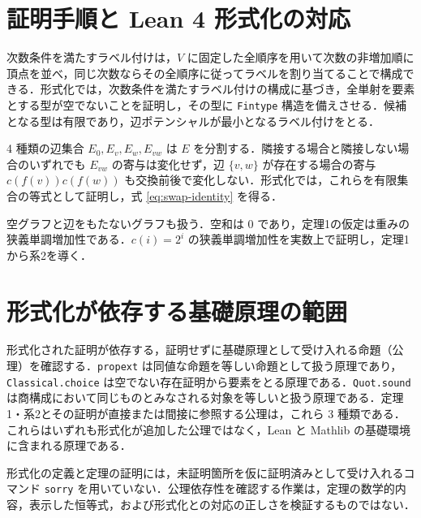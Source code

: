 \documentclass[lualatex,article]{jlreq}
\theoremstyle{jremark}
\begin{document}
\section{証明手順と Lean 4 形式化の対応}

次数条件を満たすラベル付けは，$V$ に固定した全順序を用いて次数の非増加順に頂点を並べ，同じ次数ならその全順序に従ってラベルを割り当てることで構成できる．形式化では，次数条件を満たすラベル付けの構成に基づき，全単射を要素とする型が空でないことを証明し，その型に \texttt{Fintype} 構造を備えさせる．候補となる型は有限であり，辺ポテンシャルが最小となるラベル付けをとる．

4 種類の辺集合 $E_0,E_v,E_w,E_{vw}$ は $E$ を分割する．隣接する場合と隣接しない場合のいずれでも $E_{vw}$ の寄与は変化せず，辺 $\{v,w\}$ が存在する場合の寄与 $c(f(v))c(f(w))$ も交換前後で変化しない．形式化では，これらを有限集合の等式として証明し，式 \eqref{eq:swap-identity} を得る．

空グラフと辺をもたないグラフも扱う．空和は $0$ であり，定理1の仮定は重みの狭義単調増加性である．$c(i)=2^i$ の狭義単調増加性を実数上で証明し，定理1から系2を導く．

\section{形式化が依存する基礎原理の範囲}

形式化された証明が依存する，証明せずに基礎原理として受け入れる命題（公理）を確認する．\texttt{propext} は同値な命題を等しい命題として扱う原理であり，\texttt{Classical.choice} は空でない存在証明から要素をとる原理である．\texttt{Quot.sound} は商構成において同じものとみなされる対象を等しいと扱う原理である．定理1・系2とその証明が直接または間接に参照する公理は，これら 3 種類である．これらはいずれも形式化が追加した公理ではなく，Lean と Mathlib の基礎環境に含まれる原理である．

形式化の定義と定理の証明には，未証明箇所を仮に証明済みとして受け入れるコマンド \texttt{sorry} を用いていない．公理依存性を確認する作業は，定理の数学的内容，表示した恒等式，および形式化との対応の正しさを検証するものではない．

\enlargethispage{5\baselineskip}
\printbibliography[heading=bibintoc,title={参考文献}]
\end{document}
